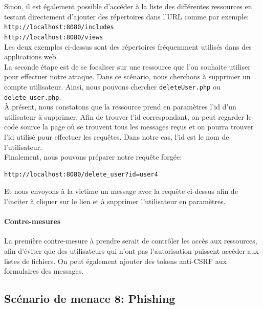 \documentclass[a4paper,10pt]{article}
\begin{document}
        Sinon, il est également possible d'accéder à la liste des différentes ressources en testant directement d'ajouter des répertoires dans l'URL comme par exemple: \\
        
        \verb|http://localhost:8080/includes| \\
        \verb|http://localhost:8080/views| \\
        
        Les deux exemples ci-dessus sont des répertoires fréquemment utilisés dans des applications web. \\
        
        La seconde étape est de se focaliser sur une ressource que l'on souhaite utiliser pour effectuer notre attaque. Dans ce scénario, nous cherchons à supprimer un compte utilisateur. Ainsi, nous pouvons chercher \verb|deleteUser.php| ou \verb|delete_user.php|. \\
        
        À présent, nous constatons que la ressource prend en paramètres l'id d'un utilisateur à supprimer. Afin de trouver l'id correspondant, on peut regarder le code source la page où se trouvent tous les messages reçus et on pourra trouver l'id utilisé pour effectuer les requêtes. Dans notre cas, l'id est le nom de l'utilisateur. \\
        
        Finalement, nous pouvons préparer notre requête forgée:
                \begin{lstlisting}[language=html]
http://localhost:8080/delete_user?id=user4
\end{lstlisting} 

Et nous envoyons à la victime un message avec la requête ci-dessus afin de l'inciter à cliquer sur le lien et à supprimer l'utilisateur en paramètres.
        
        \paragraph{Contre-mesures} La première contre-mesure à prendre serait de contrôler les accès aux ressources, afin d'éviter que des utilisateurs qui n'ont pas l'autorisation puissent accéder aux listes de fichiers. On peut également ajouter des tokens anti-CSRF aux formulaires des messages.
    \subsection*{Scénario de menace 8: Phishing}
\end{document}
